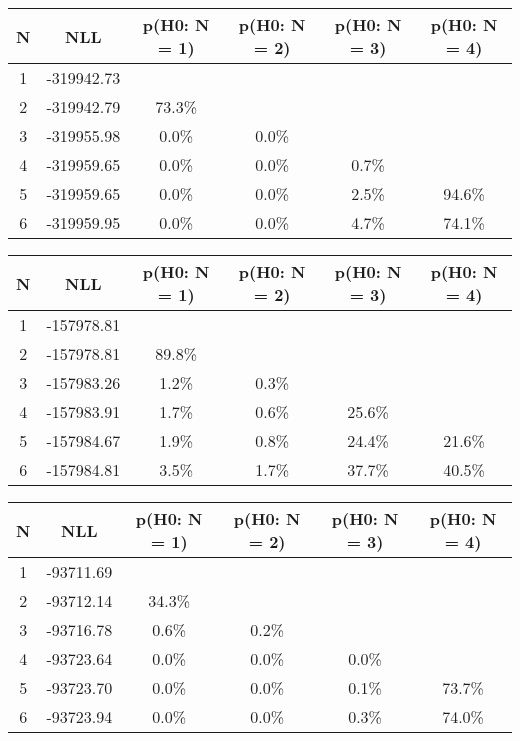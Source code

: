 \begin{table}[htb]
	\begin{center}
{\footnotesize\renewcommand{\arraystretch}{1.4}
		\begin{tabular}{cc||cccc}
			N & NLL & p(H0: N = 1) & p(H0: N = 2) & p(H0: N = 3) & p(H0: N = 4)\\ 
		\hline
1 & -319942.73 & & & & \\
2 & -319942.79 & 73.3\% & & & \\
3 & -319955.98 & 0.0\% & 0.0\% & & \\
4 & -319959.65 & 0.0\% & 0.0\% & 0.7\% & \\
5 & -319959.65 & 0.0\% & 0.0\% & 2.5\% & 94.6\% \\
6 & -319959.95 & 0.0\% & 0.0\% & 4.7\% & 74.1\% \\
	\end{tabular}
		\label{tab:lab}
	}
	\end{center}\end{table}

\begin{table}[htb]
	\begin{center}
{\footnotesize\renewcommand{\arraystretch}{1.4}
		\begin{tabular}{cc||cccc}
			N & NLL & p(H0: N = 1) & p(H0: N = 2) & p(H0: N = 3) & p(H0: N = 4)\\ 
		\hline
1 & -157978.81 & & & & \\
2 & -157978.81 & 89.8\% & & & \\
3 & -157983.26 & 1.2\% & 0.3\% & & \\
4 & -157983.91 & 1.7\% & 0.6\% & 25.6\% & \\
5 & -157984.67 & 1.9\% & 0.8\% & 24.4\% & 21.6\% \\
6 & -157984.81 & 3.5\% & 1.7\% & 37.7\% & 40.5\% \\
	\end{tabular}
		\label{tab:lab}
	}
	\end{center}\end{table}

\begin{table}[htb]
	\begin{center}
{\footnotesize\renewcommand{\arraystretch}{1.4}
		\begin{tabular}{cc||cccc}
			N & NLL & p(H0: N = 1) & p(H0: N = 2) & p(H0: N = 3) & p(H0: N = 4)\\ 
		\hline
1 & -93711.69 & & & & \\
2 & -93712.14 & 34.3\% & & & \\
3 & -93716.78 & 0.6\% & 0.2\% & & \\
4 & -93723.64 & 0.0\% & 0.0\% & 0.0\% & \\
5 & -93723.70 & 0.0\% & 0.0\% & 0.1\% & 73.7\% \\
6 & -93723.94 & 0.0\% & 0.0\% & 0.3\% & 74.0\% \\
	\end{tabular}
		\label{tab:lab}
	}
	\end{center}\end{table}

